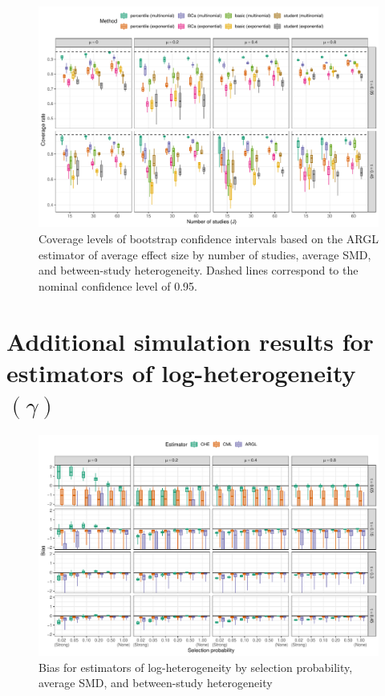 \documentclass[
  man, donotrepeattitle,floatsintext]{apa7}
\begin{document}
\begin{figure}
\includegraphics{selection_models_draft_files/figure-latex/ARGL-coverage-full-1} \caption{Coverage levels of bootstrap confidence intervals based on the ARGL estimator of average effect size by number of studies, average SMD, and between-study heterogeneity. Dashed lines correspond to the nominal confidence level of 0.95.}\label{fig:ARGL-coverage-full}
\end{figure}

\section{\texorpdfstring{Additional simulation results for estimators of log-heterogeneity \((\gamma)\)}{Additional simulation results for estimators of log-heterogeneity (\textbackslash gamma)}}\label{gamma-simulation-results}

\begin{figure}
\includegraphics{selection_models_draft_files/figure-latex/heterogeneity-bias-1} \caption{Bias for estimators of log-heterogeneity by selection probability, average SMD, and between-study heterogeneity}\label{fig:heterogeneity-bias}
\end{figure}
\end{document}
